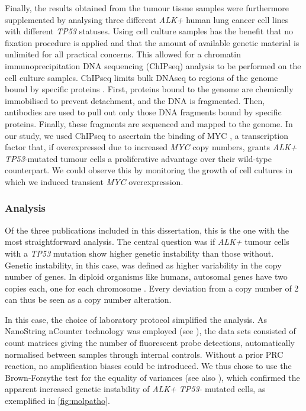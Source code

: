 Finally\label{mar:cellcult}, the results obtained
from the tumour tissue samples were furthermore supplemented by analysing
three different \textit{ALK+} human lung cancer cell lines with different
\textit{TP53} statuses. Using cell culture samples has the benefit that no
fixation procedure is applied and that the amount of available genetic
material is unlimited for all practical concerns. This allowed for a chromatin
immunoprecipitation DNA sequencing (ChIPseq) analysis to be performed on the
cell culture samples. ChIPseq limits bulk DNAseq to regions of the genome
bound by specific proteins \citep{Park2009}. First, proteins bound to the
genome are chemically immobilised to prevent detachment, and the DNA is
fragmented. Then, antibodies are used to pull out only those DNA fragments
bound by specific proteins. Finally, these fragments are sequenced and mapped
to the genome. In our study, we used ChIPseq to ascertain the binding of MYC
\citep{Dang2012}, a transcription factor that, if overexpressed due to
increased \textit{MYC} copy numbers, grants \textit{ALK+ TP53}-mutated tumour
cells a proliferative advantage over their wild-type counterpart. We could
observe this by monitoring the growth of cell cultures in which we induced
transient \textit{MYC} overexpression.

\subsubsection{Analysis}\label{subsubsec:alkanalysis}
Of the three publications included in this dissertation, this is the one with
the most straightforward analysis. The central question was if \textit{ALK+}
tumour cells with a \textit{TP53} mutation show higher genetic instability
than those without. Genetic instability, in this case, was defined as higher
variability in the copy number of genes. In diploid organisms like humans,
autosomal genes have two copies each, one for each chromosome \citep{Hartl2009}.
Every deviation from a copy number of \num{2} can thus be seen as a copy
number alteration.

In this case, the choice of laboratory protocol simplified the analysis. As
NanoString nCounter technology was employed (see ),
the data sets consisted of count matrices giving the number of fluorescent
probe detections, automatically normalised between samples through internal
controls. Without a prior PRC reaction, no amplification biases could be
introduced. We thus chose to use the Brown-Forsythe test for the equality of
variances \citep{Brown1974} (see also ), which
confirmed the apparent increased genetic instability of \textit{ALK+ TP53}-
mutated cells, as exemplified in \cref{fig:molpatho}.

